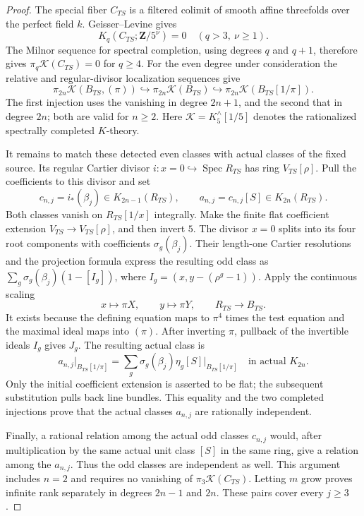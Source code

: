 \documentclass[11pt,a4paper]{amsart}
\numberwithin{equation}{section}
\theoremstyle{definition}
\theoremstyle{remark}
\begin{document}
\begin{proof}
The special fiber $C_{TS}$ is a filtered colimit of smooth
affine threefolds over the perfect field $k$.  Geisser--Levine
\cite[Theorem~8.4]{GeisserLevineCharP} gives
\[
 K_q(C_{TS};\mathbf Z/5^\nu)=0
      \quad(q>3,\ \nu\geq1).
\]
The Milnor sequence for spectral completion, using degrees
$q$ and $q+1$, therefore gives
$\pi_q\mathcal K(C_{TS})=0$ for $q\geq4$.
For the even degree under consideration the relative and
regular-divisor localization sequences give
\[
 \pi_{2n}\mathcal K(B_{TS},(\pi))
   \hookrightarrow\pi_{2n}\mathcal K(B_{TS})
   \hookrightarrow\pi_{2n}\mathcal K(B_{TS}[1/\pi]).
\]
The first injection uses the vanishing in degree $2n+1$,
and the second that in degree $2n$; both are valid for $n\geq2$.
Here $\mathcal K=K^\wedge_5[1/5]$ denotes the rationalized
spectrally completed $K$-theory.

It remains to match these detected even classes with actual
classes of the fixed source.  Its regular Cartier divisor
$i:x=0\hookrightarrow\operatorname{Spec}R_{TS}$ has ring
$V_{TS}[\rho]$.  Pull the coefficients to this divisor and set
\[
 c_{n,j}=i_*(\beta_j)\in K_{2n-1}(R_{TS}),\qquad
 a_{n,j}=c_{n,j}[S]\in K_{2n}(R_{TS}).
\]
Both classes vanish on $R_{TS}[1/x]$ integrally.
Make the finite flat coefficient extension
$V_{TS}\to V_{TS}[\rho]$, and then invert $5$.
The divisor $x=0$ splits into its four root components with
coefficients $\sigma_g(\beta_j)$.
Their length-one Cartier resolutions and the projection
formula express the resulting odd class as
$\sum_g\sigma_g(\beta_j)(1-[I_g])$, where
$I_g=(x,y-(\rho^g-1))$.
Apply the continuous scaling
\[
 x\longmapsto\pi X,\qquad y\longmapsto\pi Y,\qquad
 R_{TS}\longrightarrow B_{TS}.
\]
It exists because the defining equation maps to $\pi^4$ times
the test equation and the maximal ideal maps into $(\pi)$.
After inverting $\pi$, pullback of the invertible ideals $I_g$
gives $J_g$. The resulting actual class is
\[
 a_{n,j}|_{B_{TS}[1/\pi]}
   =\sum_g\sigma_g(\beta_j)\eta_g[S]\big|_{B_{TS}[1/\pi]}
       \quad\text{in actual }K_{2n}.
\]
Only the initial coefficient extension is asserted to be flat;
the subsequent substitution pulls back line bundles.
This equality and the two completed injections prove that
the actual classes $a_{n,j}$ are rationally independent.

Finally, a rational relation among the actual odd classes
$c_{n,j}$ would, after multiplication by the same actual unit
class $[S]$ in the same ring, give a relation among the
$a_{n,j}$.  Thus the odd classes are independent as well.
This argument includes $n=2$ and requires no vanishing of
$\pi_3\mathcal K(C_{TS})$.
Letting $m$ grow proves infinite rank separately in degrees
$2n-1$ and $2n$.  These pairs cover every $j\geq3$.
\end{proof}
\end{document}
